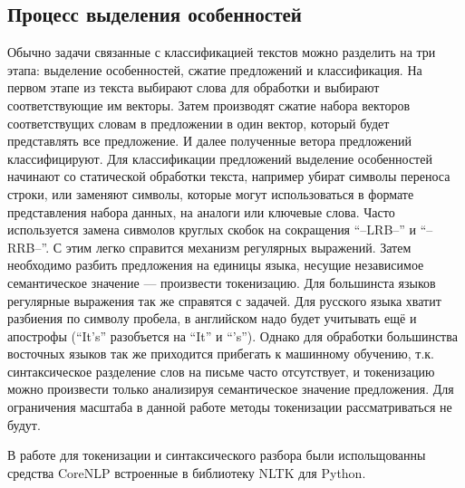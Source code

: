 \subsection{Процесс выделения особенностей}\label{subsec:overview:overview_feature_extraction}
Обычно задачи связанные с классификацией текстов можно разделить на три этапа: выделение особенностей, сжатие предложений и классификация. На первом этапе из текста выбирают слова для обработки и выбирают соответствующие им векторы. Затем производят сжатие набора векторов соответствущих словам в предложении в один вектор, который будет представлять все предложение. И далее полученные ветора предложений классифицируют.\cite{Goodfellow-et-al-2016}
Для классификации предложений выделение особенностей начинают со статической обработки текста, например убират символы переноса строки, или заменяют символы, которые могут использоваться в формате представления набора данных, на аналоги или ключевые слова. Часто используется замена сивмолов круглых скобок на сокращения ``--LRB--'' и ``--RRB--''. С этим легко справится механизм регулярных выражений. Затем необходимо разбить предложения на единицы языка, несущие независимое семантическое значение — произвести токенизацию. Для большинста языков регулярные выражения так же справятся с задачей. Для русского языка хватит разбиения по символу пробела, в английском надо будет учитывать ещё и апострофы (``It's'' разобъется на ``It'' и ``'s''). Однако для обработки большинства восточных языков так же приходится прибегать к машинному обучению, т.к. синтаксическое разделение слов на письме часто отсутствует, и токенизацию можно произвести только анализируя семантическое значение предложения. Для ограничения масштаба в данной работе методы токенизации рассматриваться не будут.\cite{Goodfellow-et-al-2016}

В работе для токенизации и синтаксического разбора были испольщованны средства CoreNLP встроенные в библиотеку NLTK для Python.

